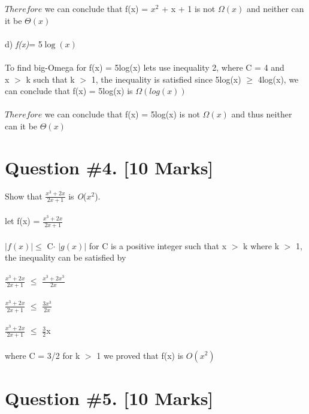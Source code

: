 \documentclass{article}
\begin{document}
$Therefore$ we can conclude that f(x) = $x^2$ + x + 1 is not $\Omega(x)$ and neither can it be $\Theta(x)$ \\ \\ 
d) \textit{f(x)}= 5$\log(x)$ \\ \\ 
To find big-Omega for f(x) = 5log(x)  lets use inequality 2, where C = 4 and \\ x $>$ k such that k $>$ 1, the inequality is satisfied since 5log(x) $\geq$ 4log(x), we can conclude that f(x) =  5log(x) is $\Omega(log(x))$ \\\\
$Therefore$ we can conclude that f(x) = 5log(x) is not $\Omega(x)$ and thus neither can it be $\Theta(x)$
\section{Question \#4. [10 Marks]}
Show that $\frac{x^3 + 2x}{2x + 1}$ is \emph{O}($x^2$).\\ \\ 
let f(x) = $\frac{x^3 + 2x}{2x + 1}$\\\\
$\left| f(x) \right|$$\leq$ C$\cdot$ $\left| g(x) \right|$ for C is a positive integer such that x $>$ k where k $>$ 1, the inequality can be satisfied by\\\\
$\frac{x^3 + 2x}{2x + 1}$ $\leq$ $\frac{x^3 + 2x^3}{2x}$ \\\\
$\frac{x^3 + 2x}{2x + 1}$ $\leq$ $\frac{3x^3}{2x}$ \\\\
$\frac{x^3 + 2x}{2x + 1}$ $\leq$ $\frac{3}{2}$x \\\\
where C = 3/2 for k $>$ 1 we proved that f(x) is $O(x^2)$

\newpage


\section{Question \#5. [10 Marks]}
\end{document}
